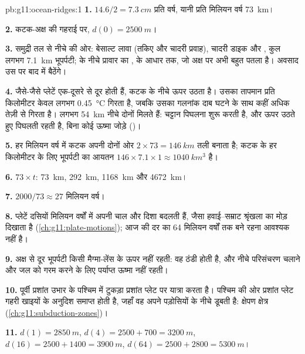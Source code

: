 \begin{solution}{pb:g11:ocean-ridges:1}
\textbf{1.} $14.6/2 = \qty{7.3}{cm}$ प्रति वर्ष, यानी प्रति मिलियन वर्ष \qty{73}{km}।

\textbf{2.} कटक-अक्ष की गहराई पर, $d(0) = \qty{2500}{m}$।

\textbf{3.} समुद्री तल से नीचे की ओर: बेसाल्ट लावा (तकिए और चादरी प्रवाह),
चादरी डाइक और , कुल लगभग \qty{7.1}{km} भूपर्पटी;  के नीचे
प्रावार का ,  के आधार तक, जो अक्ष पर अभी
बहुत पतला है। अवसाद उस पर बाद में बैठेंगे।

\textbf{4.} जैसे-जैसे प्लेटें एक-दूसरे से दूर होती हैं,  कटक के नीचे ऊपर उठता है।
उसका तापमान प्रति किलोमीटर केवल लगभग \qty{0.45}{\celsius} गिरता है,
जबकि उसका गलनांक दाब घटने के साथ कहीं अधिक तेज़ी से गिरता है।
लगभग \qty{54}{km} नीचे दोनों मिलते हैं: चट्टान पिघलना शुरू करती है, और
ऊपर उठते हुए पिघलती रहती है, बिना कोई ऊष्मा जोड़े ()।

\textbf{5.} हर मिलियन वर्ष में कटक अपनी दोनों ओर $2 \times 73 = \qty{146}{km}$
तली बनाता है; कटक के हर किलोमीटर के लिए भूपर्पटी का आयतन
$146 \times 7.1 \times 1 \approx \qty{1040}{km^3}$ है।

\textbf{6.} $73 \times t$: \qty{73}{km}, \qty{292}{km}, \qty{1168}{km} और
\qty{4672}{km}।

\textbf{7.} $2000/73 \approx 27$ मिलियन वर्ष।

\textbf{8.} प्लेटें दसियों मिलियन वर्षों में अपनी चाल और दिशा बदलती हैं,
जैसा हवाई--सम्राट श्रृंखला का मोड़ दिखाता है
(\cref{ch:g11:plate-motions}); आज की दर का 64
मिलियन वर्षों तक बने रहना आवश्यक नहीं है।

\textbf{9.} अक्ष से दूर भूपर्पटी किसी मैग्मा-लेंस के ऊपर नहीं रहती: वह
ठंडी होती है, और नीचे परिसंचरण चलाने और जल को गरम करने के लिए
पर्याप्त ऊष्मा नहीं रहती।

\textbf{10.} पूर्वी प्रशांत उभार के पश्चिम में टुकड़ा प्रशांत
प्लेट पर यात्रा करता है। पश्चिम की ओर प्रशांत प्लेट गहरी खाइयों के अनुदिश समाप्त होती है, जहाँ वह
अपने पड़ोसियों के नीचे डूबती है: क्षेपण क्षेत्र (\cref{ch:g11:subduction-zones})।

\textbf{11.} $d(1) = \qty{2850}{m}$, $d(4) = 2500 + 700 = \qty{3200}{m}$,
$d(16) = 2500 + 1400 = \qty{3900}{m}$, $d(64) = 2500 + 2800 = \qty{5300}{m}$।


\end{solution}

